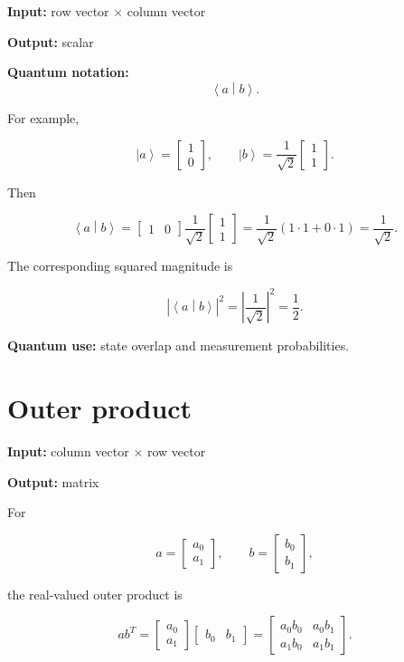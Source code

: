 \documentclass[11pt,a4paper]{article}
\newcommand{\ket}[1]{\left|#1\right\rangle}
\newcommand{\braket}[2]{\left\langle #1 \middle| #2 \right\rangle}
\begin{document}
\textbf{Input:} row vector $\times$ column vector

\textbf{Output:} scalar

\textbf{Quantum notation:}
\[
\braket{a}{b}.
\]

For example,

\[
\ket{a} =
\begin{bmatrix}
1\\0
\end{bmatrix},
\qquad
\ket{b} =
\frac{1}{\sqrt{2}}
\begin{bmatrix}
1\\1
\end{bmatrix}.
\]

Then

\[
\braket{a}{b}
=
\begin{bmatrix}
1 & 0
\end{bmatrix}
\frac{1}{\sqrt{2}}
\begin{bmatrix}
1\\1
\end{bmatrix}
=
\frac{1}{\sqrt{2}}
(1\cdot1+0\cdot1)
=
\frac{1}{\sqrt{2}}.
\]

The corresponding squared magnitude is

\[
\left|\braket{a}{b}\right|^2
=
\left|\frac{1}{\sqrt{2}}\right|^2
=
\frac{1}{2}.
\]

\textbf{Quantum use:} state overlap and measurement probabilities.

\section{Outer product}

\textbf{Input:} column vector $\times$ row vector

\textbf{Output:} matrix

For

\[
a =
\begin{bmatrix}
a_0\\a_1
\end{bmatrix},
\qquad
b =
\begin{bmatrix}
b_0\\b_1
\end{bmatrix},
\]

the real-valued outer product is

\[
ab^T
=
\begin{bmatrix}
a_0\\a_1
\end{bmatrix}
\begin{bmatrix}
b_0 & b_1
\end{bmatrix}
=
\begin{bmatrix}
a_0b_0 & a_0b_1\\
a_1b_0 & a_1b_1
\end{bmatrix}.
\]
\end{document}

